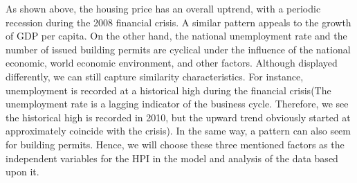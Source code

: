 \documentclass[11pt]{article}
\begin{document}
\begin{figure}[H]
\captionsetup[subfigure]{labelformat=empty}
\centering
{}
\end{figure}

As shown above, the housing price has an overall uptrend, with a periodic recession during the 2008 financial crisis. A similar pattern appeals to the growth of GDP per capita. On the other hand, the national unemployment rate and the number of issued building permits are cyclical under the influence of the national economic, world economic environment, and other factors. Although displayed differently, we can still capture similarity characteristics. For instance, unemployment is recorded at a historical high during the financial crisis(The unemployment rate is a lagging indicator of the business cycle. Therefore, we see the historical high is recorded in 2010, but the upward trend obviously started at approximately coincide with the crisis). In the same way, a pattern can also seem for building permits. 
Hence, we will choose these three mentioned factors as the independent variables for the HPI in the model and analysis of the data based upon it.  
\end{document}
